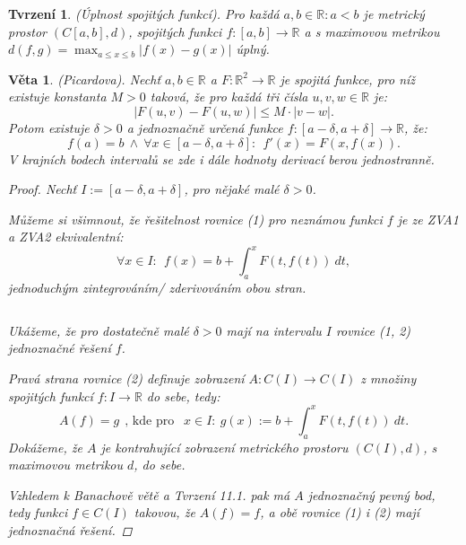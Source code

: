 \documentclass[10pt,a4paper]{article}
\newcommand{\R}{{\mathbb{R}}}       %
\newtheorem*{thm}{Věta}
\newtheorem{prp}{Tvrzení}[section]
\begin{document}
\begin{prp} (Úplnost spojitých funkcí). Pro každá $a,b \in \R: a < b$ je metrický prostor $(C[a, b], d)$, spojitých funkci $f : [a, b] \to \R$ a s maximovou metrikou $ \displaystyle d(f,g) = \max_{a\leq x\leq b} |f(x) - g(x)|$ úplný.
\end{prp}

\begin{thm}(Picardova). Nechť $a, b \in \R$ a $F : \R^2 \to \R$ je spojitá funkce, pro níž existuje konstanta $M > 0$ taková, že pro každá tři čísla $u, v, w \in \R$ je: $$|F (u, v) - F (u, w)| \leq M \cdot |v - w|.$$
	Potom existuje $\delta > 0$ a jednoznačně určená funkce $f : [a - \delta, a + \delta] \to \R$, že: \begin{equation}
	f (a) = b ~\land ~ \forall x \in [a - \delta, a + \delta] :~~ f' (x) = F (x, f (x)).
	\end{equation}
	V krajních bodech intervalů se zde i dále hodnoty derivací berou jednostranně.
	
	\begin{proof}
		Nechť $I := [a -\delta, a + \delta]$, pro nějaké malé $\delta > 0$. 
		
		Můžeme si všimnout, že řešitelnost \textit{rovnice (1)} pro neznámou funkci $ f $ je ze \textit{ZVA1} a \textit{ZVA2} ekvivalentní: \begin{equation}
			\forall x \in I: ~~ f(x) = b + \int_{a}^{x} F(t, f(t)) ~dt,
		\end{equation}
		jednoduchým zintegrováním/ zderivováním obou stran.
		
		$ $
		
		Ukážeme, že pro dostatečně malé $\delta > 0$ mají na intervalu $ I $ \textit{rovnice (1, 2)} jednoznačné řešení $ f $. 
		
		Pravá strana \textit{rovnice (2)} definuje zobrazení $A : C(I) \to C(I)$ z množiny spojitých funkcí $f : I \to \R$ do sebe, tedy:
		\[
		A(f) = g ~~ \text{, kde pro } ~~x \in I: ~g(x) := b+  \int_{a}^{x} F(t, f(t)) ~dt.
		\]
		Dokážeme, že $ A $ je kontrahující zobrazení metrického prostoru $ (C(I), d) $, s maximovou metrikou $ d $, do sebe. 
		
		Vzhledem k \textit{Banachově větě} a \textit{Tvrzení 11.1.} pak má $ A $ jednoznačný \textit{pevný bod}, tedy funkci $f \in C(I)$ takovou, že $A(f) = f$, a obě rovnice \textit{(1)} i \textit{(2)} mají jednoznačná řešení.


\end{proof}
\end{thm}
\end{document}

